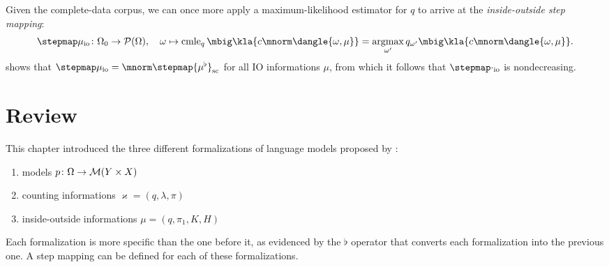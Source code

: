 Given the complete-data corpus, we can once more apply a maximum-likelihood
estimator for $q$ to arrive at the \emph{inside-outside step mapping}:
\[
 \stepmap\mu_\mathrm{io}\colon \Omega_0 \to \up(\Omega), \quad
 \omega \mapsto \cmle_q\mbig\kla{c\mnorm\dangle{\omega,\mu}} = \argmax_{\omega'} q_{\omega'}\mbig\kla{c\mnorm\dangle{\omega,\mu}}.
\]
\cite[pp.~16]{bucstuvog15} shows that $\stepmap\mu_\mathrm{io} =
\mnorm\stepmap{\mu^\flat}_\mathrm{sc}$ for all IO informations $\mu$, from
which it follows that $\stepmap\cdot_\mathrm{io}$ is nondecreasing.

\section{Review}

This chapter introduced the three different formalizations of language models
proposed by \cite{bucstuvog15}:
\begin{enumerate}\setlength\itemsep{-0.3em}
 \item models $p\colon\Omega\to\mathcal M(Y\times X)$
 \item counting informations $\varkappa=(q,\lambda,\pi)$
 \item inside-outside informations $\mu=(q,\pi_1,K,H)$
\end{enumerate}
Each formalization is more specific than the one before it, as evidenced by the
$\flat$ operator that converts each formalization into the previous one.
A step mapping can be defined for each of these formalizations.
\begin{center}\end{center}

